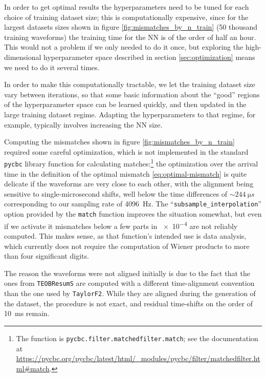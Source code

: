 \documentclass[main.tex]{subfiles}
\begin{document}
In order to get optimal results the hyperparameters need to be tuned for each choice of training dataset size; this is computationally expensive, since for the largest datasets sizes shown in figure \ref{fig:mismatches_by_n_train} (50 thousand training waveforms) the training time for the \ac{NN} is of the order of half an hour. 
This would not a problem if we only needed to do it once, but exploring the high-dimensional hyperparameter space described in section \ref{sec:optimization} means we need to do it several times. 

In order to make this computationally tractable, we let the training dataset size vary between iterations, so that some basic information about the ``good'' regions of the hyperparameter space can be learned quickly, and then updated in the large training dataset regime. 
Adapting the hyperparameters to that regime, for example, typically involves increasing the \ac{NN} size. 

Computing the mismatches shown in figure \ref{fig:mismatches_by_n_train} required some careful optimization, which is not implemented in the standard \texttt{pycbc} \cite[]{nitzGwastroPycbc2021} library function for calculating matches:\footnote{The function is \texttt{pycbc.filter.matchedfilter.match}; see the documentation at \url{https://pycbc.org/pycbc/latest/html/\_modules/pycbc/filter/matchedfilter.html\#match}.} the optimization over the arrival time in the definition of the optimal mismatch \eqref{eq:optimal-mismatch} is quite delicate if the waveforms are very close to each other, with the alignment being sensitive to single-microsecond shifts, well below the time differences of \(\sim \SI{244}{\micro s}\) corresponding to our sampling rate of \SI{4096}{Hz}. 
The ``\texttt{subsample\_interpolation}'' option provided by the \texttt{match} function improves the situation somewhat, but even if we activate it mismatches below a few parts in \num{e-4} are not reliably computed. 
This makes sense, as that function's intended use is data analysis, which currently does not require the computation of Wiener products to more than four significant digits.

The reason the waveforms were not aligned initially is due to the fact that the ones from \texttt{TEOBResumS} are computed with a different time-alignment convention than the one used by \texttt{TaylorF2}. 
While they are aligned during the generation of the dataset, the procedure is not exact, and residual time-shifts on the order of \SI{10}{ms} remain.
\end{document}
